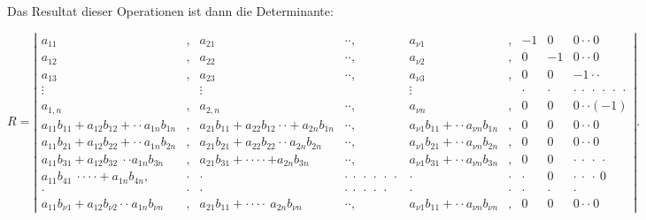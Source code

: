 \documentclass[11pt]{article}
\providecommand{\weberpage}[1]{}
\begin{document}
Das Resultat dieser Operationen ist dann die Determinante:


\weberpage{81}

{\scriptsize\setlength{\arraycolsep}{3pt}
\[
R=\left|\begin{array}{ccccccccc}
a_{11} & , & a_{21} & \cdot\cdot, & a_{\nu 1} & , & -1 & 0 & 0\cdot\cdot\ 0\\
a_{12} & , & a_{22} & \cdot\cdot, & a_{\nu 2} & , & 0 & -1 & 0\cdot\cdot\ 0\\
a_{13} & , & a_{23} & \cdot\cdot, & a_{\nu 3} & , & 0 & 0 & -1\cdot\cdot\\
\vdots & & \vdots & & \vdots & & \cdot & \cdot & \cdot\ \cdot\ \cdot\ \cdot\ \cdot\ \cdot\\
a_{1,n} & , & a_{2,n} & \cdot\cdot, & a_{\nu n} & , & 0 & 0 & 0\cdot\cdot(-1)\\
a_{11}b_{11}+a_{12}b_{12}+\cdot\cdot a_{1n}b_{1n} & , & a_{21}b_{11}+a_{22}b_{12}\cdot\cdot+a_{2n}b_{1n} & \cdot\cdot, & a_{\nu 1}b_{11}+\cdot\cdot a_{\nu n}b_{1n} & , & 0 & 0 & 0\cdot\cdot\ 0\\
a_{11}b_{21}+a_{12}b_{22}+\cdot\cdot a_{1n}b_{2n} & , & a_{21}b_{21}+a_{22}b_{22}\cdot\cdot\ a_{2n}b_{2n} & \cdot\cdot, & a_{\nu 1}b_{21}+\cdot\cdot a_{\nu n}b_{2n} & , & 0 & 0 & 0\cdot\cdot\ 0\\
a_{11}b_{31}+a_{12}b_{32}\ \cdot\cdot a_{1n}b_{3n} & , & a_{21}b_{31}+\cdot\cdot\cdot\cdot+a_{2n}b_{3n} & \cdot\cdot, & a_{\nu 1}b_{31}+\cdot\cdot a_{\nu n}b_{3n} & , & 0 & 0 & \cdot\ \cdot\ \cdot\ \cdot\\
a_{11}b_{41}\ \cdot\cdot\cdot\cdot+a_{1n}b_{4n}, & \cdot & \cdot & \cdot\ \cdot\ \cdot\ \cdot\ \cdot\ \cdot & \cdot & \cdot & \cdot & 0 & \cdot\ \cdot\ \cdot\ 0\\
\cdot & \cdot & \cdot & \cdot\ \cdot\ \cdot\ \cdot\ \cdot & \cdot & \cdot & \cdot & \cdot & \cdot\\
a_{11}b_{\nu 1}+a_{12}b_{\nu 2}\cdot\cdot\ a_{1n}b_{\nu n} & , & a_{21}b_{11}+\cdot\cdot\cdot\cdot\ a_{2n}b_{\nu n} & \cdot\cdot, & a_{\nu 1}b_{11}+\cdot\cdot a_{\nu n}b_{\nu n} & , & 0 & 0 & 0\cdot\cdot\ 0
\end{array}\right|.
\]
}
\end{document}
